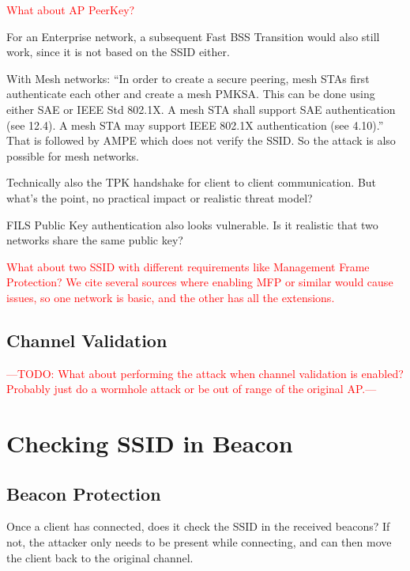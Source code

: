 \documentclass[sigconf,review]{acmart}
\DeclareRobustCommand{\red}[1]{\textcolor{red}{#1}}
\begin{document}
\red{What about AP PeerKey?}

For an Enterprise network, a subsequent Fast BSS Transition would also still work, since it is not based on the SSID either.

With Mesh networks: ``In order to create a secure peering, mesh STAs first authenticate each other and create a mesh PMKSA. This can be done using either SAE or IEEE Std 802.1X. A mesh STA shall support SAE authentication (see 12.4). A mesh STA may support IEEE 802.1X authentication (see 4.10).''
That is followed by AMPE which does not verify the SSID.
So the attack is also possible for mesh networks.

Technically also the TPK handshake for client to client communication.
But what's the point, no practical impact or realistic threat model?

FILS Public Key authentication also looks vulnerable.
Is it realistic that two networks share the same public key?

\red{
What about two SSID with different requirements like Management Frame Protection?
We cite several sources where enabling MFP or similar would cause issues, so one network is basic, and the other has all the extensions.}

\subsection{Channel Validation}

\red{---TODO: What about performing the attack when channel validation is enabled? Probably just do a wormhole attack or be out of range of the original AP.---}

\section{Checking SSID in Beacon}

\subsection{Beacon Protection}

Once a client has connected, does it check the SSID in the received beacons?
If not, the attacker only needs to be present while connecting, and can then move the client back to the original channel.
\end{document}
